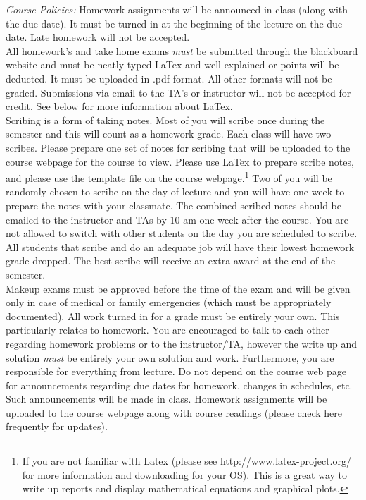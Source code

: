 \documentclass[11pt]{article}
\begin{document}
\emph{Course Policies:} 
Homework assignments will be announced in class (along with the due date). It must be turned in at the beginning of the lecture on the due date. Late homework will not be accepted.\\

All homework's and take home exams \emph{must} be submitted through the blackboard website and must be neatly typed LaTex and well-explained or points will be deducted. It must be uploaded in .pdf format. All other formats will not be graded. Submissions via email to the TA's or instructor will not be accepted for credit. See below for more information about LaTex. \\

Scribing is a form of taking notes. Most of you will scribe once during the semester and this will count as a homework grade. Each class will have two scribes. Please prepare one set of notes for scribing that will be uploaded to the course webpage for the course to view. 
Please use LaTex to prepare scribe notes, and please use the template file on the course webpage.\footnote{If you are not familiar
with Latex (please see http://www.latex-project.org/ for more information and downloading for your OS).  This is a great way to write up reports
and display mathematical equations and graphical plots.} Two of you will be randomly chosen to scribe on the day of lecture and you will have one week to prepare the notes with your classmate. The combined scribed notes should be emailed to the instructor and TAs by 10 am one week after the course. You are not allowed to switch with other students on the day you are scheduled to scribe. All students that scribe and do an adequate job will have their lowest homework grade dropped. The best scribe will receive an extra award at the end of the semester.  \\

Makeup exams must be approved before the time of the exam and will be given only in case
of medical or family emergencies (which must be appropriately documented). All work turned in for a grade
must be entirely your own. This particularly relates to homework. You are encouraged to talk to each other regarding homework problems or to the instructor/TA, however the write up and solution \emph{must} be entirely your own solution and work. 
%
Furthermore, you are responsible for everything from lecture. Do not depend on the course web page for announcements regarding due dates for homework, changes in schedules, etc. Such announcements will be made in class. Homework assignments will be uploaded to the course webpage along with course readings (please check here frequently for updates).\\
\end{document}
